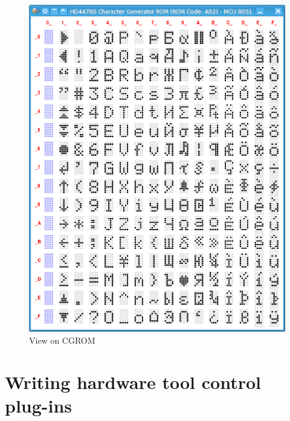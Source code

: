 \documentclass[a4paper,twoside,12pt]{book}
\begin{document}
\begin{figure}[h!]
\begin{minipage}[b]{.5\textwidth}
					\includegraphics[width=\textwidth]{img/047.png}
					\caption{View on CGROM}
				\end{minipage}
			\end{figure}

\chapter{Writing hardware tool control plug-ins}
	\label{sec:WritingHardwareToolControlPlugIns}
\end{document}
